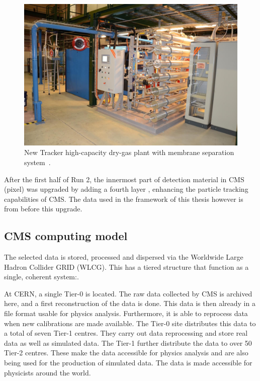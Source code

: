 \begin{figure}[htbp]
\begin{minipage}[t]{0.59\textwidth}
		\includegraphics[width=\textwidth]{2_ExperimentalSetup/Figures/plant}
		\caption{New Tracker high-capacity dry-gas plant with membrane separation system~\cite{Pralavorio:2024977}.}
		\label{fig:TrackLS1}
	\end{minipage}
	
\end{figure}


After the first half of Run 2, the innermost part of detection material in CMS (pixel) was upgraded by adding a fourth layer , enhancing the particle tracking capabilities of CMS. The data used in the framework of this thesis however is from before this upgrade. 


\subsection{CMS computing model}
The selected data is stored, processed and dispersed via the Worldwide Large Hadron Collider GRID (WLCG)\cite{Grandi:814248,Eck:840543}. This has a tiered structure that function as a single, coherent system:. 

At CERN, a single Tier-0 is located. The raw data collected by CMS is archived here, and a first reconstruction of the data is done. This data is then already in a file format usable for physics analysis. Furthermore, it is able to reprocess data when new calibrations are made available. The Tier-0 site distributes this data to a total of seven Tier-1 centres. They carry out data reprocessing and store real data as well as simulated  data. The Tier-1 further distribute the data to over 50 Tier-2 centres. These make the data accessible for physics analysis and are also being used for the production of simulated data. The data is made accessible for  physicists around the world. 
